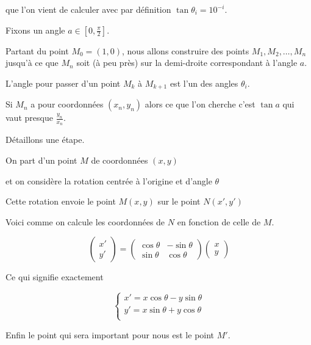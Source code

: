 que l'on vient de calculer  avec par définition $\tan \theta_i = 10^{-i}$. 


Fixons un angle $a \in [0,\frac\pi2]$.


Partant du point $M_0 = (1,0)$, nous allons construire des points $M_1,M_2,\ldots,M_n$
jusqu'à ce que $M_n$ soit (à peu près) sur la demi-droite correspondant à l'angle $a$.

L'angle pour passer d'un point $M_k$ à $M_{k+1}$ est l'un des angles $\theta_i$.

Si $M_n$ a pour coordonnées $(x_n,y_n)$ alors ce que l'on cherche c'est $\tan a$ qui vaut presque
$\frac{y_n}{x_n}$.




\diapo

Détaillons une étape.

\change

On part d'un point $M$ de coordonnées $(x,y)$ 

\change

et on considère la rotation centrée à l'origine et d'angle $\theta$

Cette rotation envoie le point $M(x,y)$ sur le point $N(x',y')$ 

\change

Voici comme on calcule les coordonnées de $N$ en fonction de celle de $M$.


$$\begin{pmatrix} x' \\ y' \end{pmatrix}
= \begin{pmatrix} \cos \theta & - \sin \theta \\ \sin \theta & \cos \theta \end{pmatrix}
\begin{pmatrix} x \\y \end{pmatrix}$$


\change

Ce qui signifie exactement 

$$
\left\{ \begin{array}{rcl} 
        x' = x \cos \theta - y \sin \theta \\
        y' = x \sin \theta + y \cos \theta \\
        \end{array}
\right. $$


\change

Enfin le point qui sera important pour  nous est le point $M'$.

